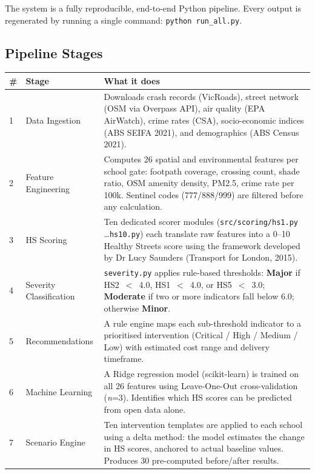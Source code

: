 \documentclass[11pt,a4paper]{article}
\begin{document}
The system is a fully reproducible, end-to-end Python pipeline. Every output is regenerated by running a single command: \texttt{python run\_all.py}.

\subsection{Pipeline Stages}

\vspace{4pt}
\begin{tabularx}{\linewidth}{C{0.5cm} L{3.2cm} L{9.5cm}}
\toprule
{}
\color{white}\textbf{\#} & \color{white}\textbf{Stage} & \color{white}\textbf{What it does} \\
\midrule
{}
1 & Data Ingestion      & Downloads crash records (VicRoads), street network (OSM via Overpass API), air quality (EPA AirWatch), crime rates (CSA), socio-economic indices (ABS SEIFA 2021), and demographics (ABS Census 2021). \\
2 & Feature Engineering & Computes 26 spatial and environmental features per school gate: footpath coverage, crossing count, shade ratio, OSM amenity density, PM2.5, crime rate per 100k. Sentinel codes (777/888/999) are filtered before any calculation. \\
3 & HS Scoring          & Ten dedicated scorer modules (\texttt{src/scoring/hs1.py} \ldots \texttt{hs10.py}) each translate raw features into a 0--10 Healthy Streets score using the framework developed by Dr Lucy Saunders (Transport for London, 2015). \\
4 & Severity Classification & \texttt{severity.py} applies rule-based thresholds: \textbf{Major} if HS2~$<$~4.0, HS1~$<$~4.0, or HS5~$<$~3.0; \textbf{Moderate} if two or more indicators fall below 6.0; otherwise \textbf{Minor}. \\
5 & Recommendations     & A rule engine maps each sub-threshold indicator to a prioritised intervention (Critical / High / Medium / Low) with estimated cost range and delivery timeframe. \\
6 & Machine Learning    & A Ridge regression model (scikit-learn) is trained on all 26 features using Leave-One-Out cross-validation (\textit{n}=3). Identifies which HS scores can be predicted from open data alone. \\
7 & Scenario Engine     & Ten intervention templates are applied to each school using a delta method: the model estimates the change in HS scores, anchored to actual baseline values. Produces 30 pre-computed before/after results. \\

\end{tabularx}
\end{document}
